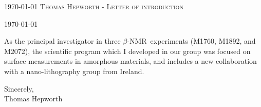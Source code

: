 \documentclass{simplehipstercv_cl}
\newcommand{\bnmr}{$\beta$-NMR}
\begin{document}
	\makecvheader

	\makecvfooter
		{\textsc{ \today}}
				{%
		}{\textsc{Thomas Hepworth - Letter of introduction}}

\vspace{0.75cm}

\color{accentcolor}
\today \par \vspace{-0.1cm}
\vspace{0.5cm}



As the principal investigator in three \bnmr\ experiments (M1760, M1892, and M2072), the scientific program which I developed in our group was focused on surface measurements in amorphous materials, and includes a new collaboration with a nano-lithography group from Ireland.




\vspace{0.5cm}
\raggedright
Sincerely,\\
\vspace{0.25cm}
Thomas Hepworth
\end{document}
